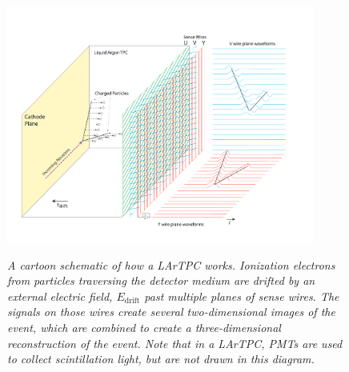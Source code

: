 \begin{figure}[ht!]
\centering
	\includegraphics[width=0.9\textwidth]{Figures/LArTPC_concept.png} \\
\caption{\textit{A cartoon schematic of how a LArTPC works. Ionization electrons from particles traversing the detector medium are drifted by an external electric field, $E_{\text{drift}}$ past multiple planes of sense wires. The signals on those wires create several two-dimensional images of the event, which are combined to create a three-dimensional reconstruction of the event. Note that in a LArTPC, PMTs are used to collect scintillation light, but are not drawn in this diagram.}}\label{LArTPC_concept_fig}
\end{figure}


